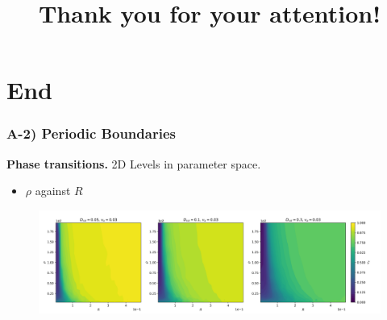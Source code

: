 \documentclass[11pt,t,usepdftitle=false,aspectratio=169]{beamer}
\begin{document}
	
	
	
	
	
	
		
	\title{Thank you for your attention!}
	\subtitle{}
	\section{End}
	
	\appendix
	\begin{frame}
		\frametitle{A-2) Periodic Boundaries}
		\textbf{Phase transitions.} 2D Levels in parameter space.
		\begin{itemize}
	    	\item $\rho$ against $R$
		\end{itemize}
		\begin{figure}[H]
  			\includegraphics[width=\textwidth]{images/chapter2/rho_r_transition_2D_plots_D_comparison.png} 
		\end{figure}
	\end{frame}
	
\end{document}
